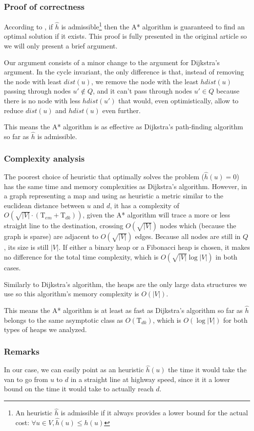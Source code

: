 \subsubsection{Proof of correctness}
According to \cite{Astar}, if $\hat{h}$ is admissible\footnote{An heuristic $\hat{h}$ is admissible if it always provides a lower bound for the actual cost: $\forall u \in V, \hat{h}(u) \leq h(u)$} then the A* algorithm is guaranteed to find an optimal solution if it exists. This proof is fully presented in the original article so we will only present a brief argument.\par
Our argument consists of a minor change to the argument for Dijkstra's argument. In the cycle invariant, the only difference is that, instead of removing the node with least $dist(u)$, we remove the node with the least $hdist(u)$ passing through nodes $u' \not \in Q$, and it can't pass through nodes $u' \in Q$ because there is no node with less $hdist(u')$ that would, even optimistically, allow to reduce $dist(u)$ and $hdist(u)$ even further.\par
This means the A* algorithm is as effective as Dijkstra's path-finding algorithm so far as $\hat{h}$ is admissible.
\subsubsection{Complexity analysis}
The poorest choice of heuristic that optimally solves the problem ($\hat{h}(u)=0$) has the same time and memory complexities as Dijkstra's algorithm. However, in a graph representing a map and using as heuristic a metric similar to the euclidean distance between $u$ and $d$, it has a complexity of $O(\sqrt{|V|} \cdot (\text{T}_{em}+\text{T}_{dk}))$, given the A* algorithm will trace a more or less straight line to the destination, crossing $O(\sqrt{|V|})$ nodes which (because the graph is sparse) are adjacent to $O(\sqrt{|V|})$ edges. Because all nodes are still in $Q$, its size is still $|V|$. If either a binary heap or a Fibonacci heap is chosen, it makes no difference for the total time complexity, which is $O(\sqrt{|V|} \log |V|)$ in both cases.\par
Similarly to Dijkstra's algorithm, the heaps are the only large data structures we use so this algorithm's memory complexity is $O(|V|)$.\par
This means the A* algorithm is at least as fast as Dijkstra's algorithm so far as $\hat{h}$ belongs to the same asymptotic class as $O(\text{T}_{dk})$, which is $O(\log |V|)$ for both types of heaps we analyzed.
\subsubsection{Remarks}
In our case, we can easily point as an heuristic $\hat{h}(u)$ the time it would take the van to go from $u$ to $d$ in a straight line at highway speed, since it it a lower bound on the time it would take to actually reach $d$.
